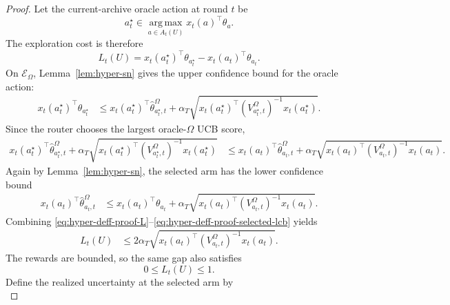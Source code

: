 \documentclass{article} %
\begin{document}
\begin{proof}
Let the current-archive oracle action at round \(t\) be
\begin{equation}
\label{eq:hyper-deff-proof-oracle-action}
a_t^\star
\in
\operatorname*{arg\,max}_{a\in A_t(U)}
x_t(a)^\top\theta_a .
\end{equation}
The exploration cost is therefore
\begin{equation}
\label{eq:hyper-deff-proof-L}
L_t(U)
=
x_t(a_t^\star)^\top\theta_{a_t^\star}
-
x_t(a_t)^\top\theta_{a_t}.
\end{equation}
On \(\mathcal{E}_{\Omega}\), Lemma~\ref{lem:hyper-sn} gives the upper confidence bound for the oracle action:
\begin{align}
\label{eq:hyper-deff-proof-oracle-ucb}
x_t(a_t^\star)^\top\theta_{a_t^\star}
&\le
x_t(a_t^\star)^\top\widehat{\theta}_{a_t^\star,t}^{\Omega}
+
\alpha_T
\sqrt{
x_t(a_t^\star)^\top
\left(V_{a_t^\star,t}^{\Omega}\right)^{-1}
x_t(a_t^\star)
}.
\end{align}
Since the router chooses the largest oracle-\(\Omega\) UCB score,
\begin{align}
\label{eq:hyper-deff-proof-argmax}
x_t(a_t^\star)^\top\widehat{\theta}_{a_t^\star,t}^{\Omega}
+
\alpha_T
\sqrt{
x_t(a_t^\star)^\top
\left(V_{a_t^\star,t}^{\Omega}\right)^{-1}
x_t(a_t^\star)
}
&\le
x_t(a_t)^\top\widehat{\theta}_{a_t,t}^{\Omega}
+
\alpha_T
\sqrt{
x_t(a_t)^\top
\left(V_{a_t,t}^{\Omega}\right)^{-1}
x_t(a_t)
}.
\end{align}
Again by Lemma~\ref{lem:hyper-sn}, the selected arm has the lower confidence bound
\begin{align}
\label{eq:hyper-deff-proof-selected-lcb}
x_t(a_t)^\top\widehat{\theta}_{a_t,t}^{\Omega}
&\le
x_t(a_t)^\top\theta_{a_t}
+
\alpha_T
\sqrt{
x_t(a_t)^\top
\left(V_{a_t,t}^{\Omega}\right)^{-1}
x_t(a_t)
}.
\end{align}
Combining \eqref{eq:hyper-deff-proof-L}--\eqref{eq:hyper-deff-proof-selected-lcb} yields
\begin{align}
\label{eq:hyper-deff-proof-gap-width}
L_t(U)
&\le
2\alpha_T
\sqrt{
x_t(a_t)^\top
\left(V_{a_t,t}^{\Omega}\right)^{-1}
x_t(a_t)
}.
\end{align}
The rewards are bounded, so the same gap also satisfies
\begin{equation}
\label{eq:hyper-deff-proof-gap-one}
0\le L_t(U)\le 1 .
\end{equation}
Define the realized uncertainty at the selected arm by
\begin{equation}
\label{eq:hyper-deff-proof-qt}

\end{equation}
\end{proof}
\end{document}
